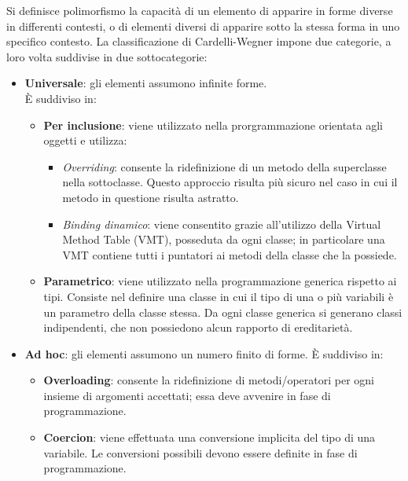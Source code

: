 \begin{solution}
Si definisce polimorfismo la capacità di un elemento di apparire in forme diverse in differenti contesti, o di elementi diversi di apparire sotto la stessa forma in uno specifico contesto.
La classificazione di Cardelli-Wegner impone due categorie, a loro volta suddivise in due sottocategorie:

\begin{itemize}
	\item \textbf{Universale}: gli elementi assumono infinite forme. \\
	È suddiviso in:
	\begin{itemize}
        \item \textbf{Per inclusione}: viene utilizzato nella prorgrammazione
            orientata agli oggetti e utilizza:
		\begin{itemize}
            \item \textit{Overriding}: consente la ridefinizione di un metodo
                della superclasse nella sottoclasse. Questo approccio risulta
                più sicuro nel caso in cui il metodo in questione risulta
                astratto.
            \item \textit{Binding dinamico}: viene consentito grazie
                all'utilizzo della Virtual Method Table (VMT), posseduta da
                ogni classe; in particolare una VMT contiene tutti i puntatori
                ai metodi della classe che la possiede.
		\end{itemize}
		\item \textbf{Parametrico}: viene utilizzato nella programmazione generica rispetto ai tipi.
		Consiste nel definire una classe in cui il tipo di una o più variabili è un parametro della classe stessa.
		Da ogni classe generica si generano classi indipendenti, che non possiedono alcun rapporto di ereditarietà.
	\end{itemize}

	\item \textbf{Ad hoc}: gli elementi assumono un numero finito di forme.
	È suddiviso in:
	\begin{itemize}
		\item \textbf{Overloading}: consente la ridefinizione di metodi/operatori per ogni insieme di argomenti
		accettati; essa deve avvenire in fase di programmazione.

		\item \textbf{Coercion}: viene effettuata una conversione implicita del tipo di una variabile. Le conversioni possibili devono essere definite in fase
		di programmazione.


\end{itemize}
\end{itemize}
\end{solution}

